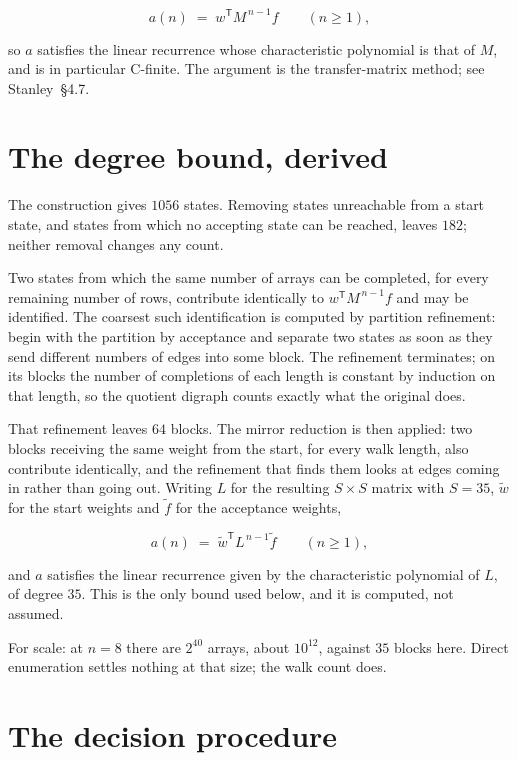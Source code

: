 \documentclass[11pt]{article}
\theoremstyle{definition}
\begin{document}
\[a(n) \;=\; w^{\mathsf T} M^{\,n-1} f \qquad (n \ge 1),\]

so $a$ satisfies the linear recurrence whose characteristic polynomial is that of $M$, and is in particular C-finite. The argument is the transfer-matrix method; see Stanley~\S4.7.

\section{The degree bound, derived}

The construction gives $1056$ states. Removing states unreachable from a start state, and states from which no accepting state can be reached, leaves $182$; neither removal changes any count.

Two states from which the same number of arrays can be completed, for every remaining number of rows, contribute identically to $w^{\mathsf T}M^{\,n-1}f$ and may be identified. The coarsest such identification is computed by partition refinement: begin with the partition by acceptance and separate two states as soon as they send different numbers of edges into some block. The refinement terminates; on its blocks the number of completions of each length is constant by induction on that length, so the quotient digraph counts exactly what the original does.

That refinement leaves $64$ blocks. The mirror reduction is then applied: two blocks receiving the same weight from the start, for every walk length, also contribute identically, and the refinement that finds them looks at edges coming in rather than going out. Writing $L$ for the resulting $S \times S$ matrix with $S = 35$, $\tilde w$ for the start weights and $\tilde f$ for the acceptance weights,

\[a(n) \;=\; \tilde w^{\mathsf T} L^{\,n-1} \tilde f \qquad (n \ge 1),\]

and $a$ satisfies the linear recurrence given by the characteristic polynomial of $L$, of degree $35$. This is the only bound used below, and it is computed, not assumed.

For scale: at $n = 8$ there are $2^{40}$ arrays, about $10^{12}$, against $35$ blocks here. Direct enumeration settles nothing at that size; the walk count does.

\section{The decision procedure}
\end{document}

